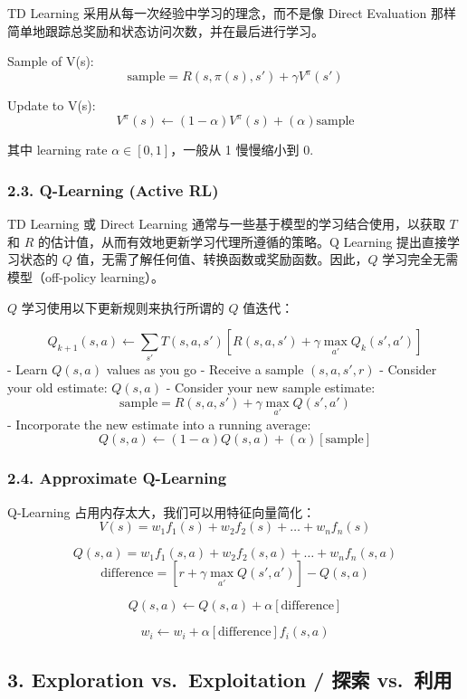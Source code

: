 \documentclass[11pt,a4paper]{article}
\begin{document}
TD Learning 采用从每一次经验中学习的理念，而不是像 Direct Evaluation 那样简单地跟踪总奖励和状态访问次数，并在最后进行学习。

Sample of V(s): \[
\text{sample} = R(s, \pi(s), s') + \gamma V^\pi(s')
\]

Update to V(s): \[
V^\pi(s) \leftarrow (1 - \alpha)V^\pi(s) + (\alpha)\text{sample}
\]

其中 learning rate \(\alpha \in [0,1]\)，一般从 1 慢慢缩小到 0.

\subsubsection{2.3. Q-Learning (Active RL)}\label{q-learning-active-rl}

TD Learning 或 Direct Learning 通常与一些基于模型的学习结合使用，以获取 \(T\) 和 \(R\) 的估计值，从而有效地更新学习代理所遵循的策略。Q Learning 提出直接学习状态的 \(Q\) 值，无需了解任何值、转换函数或奖励函数。因此，\(Q\) 学习完全无需模型（off-policy learning）。

\(Q\) 学习使用以下更新规则来执行所谓的 \(Q\) 值迭代：

\[
Q_{k+1}(s, a) \leftarrow \sum_{s'} T(s, a, s')[R(s, a, s') + \gamma \max_{a'} Q_k(s', a')]
\] - Learn \(Q(s, a)\) values as you go - Receive a sample \((s, a, s', r)\) - Consider your old estimate: \(Q(s, a)\) - Consider your new sample estimate: \[
    \text{sample} = R(s, a, s') + \gamma \max_{a'} Q(s', a')
    \] - Incorporate the new estimate into a running average: \[
    Q(s, a) \leftarrow (1 - \alpha)Q(s, a) + (\alpha) [\text{sample}]
    \]

\subsubsection{2.4. Approximate Q-Learning}\label{approximate-q-learning}

Q-Learning 占用内存太大，我们可以用特征向量简化： \[
V(s) = w_1f_1(s) + w_2f_2(s) + \dots + w_nf_n(s)
\]

\[
Q(s, a) = w_1f_1(s, a) + w_2f_2(s, a) + \dots + w_nf_n(s, a)
\] \[
\text{difference} = \left[r + \gamma \max_{a'} Q(s', a')\right] - Q(s, a)
\]

\[
Q(s, a) \leftarrow Q(s, a) + \alpha [\text{difference}]
\]

\[
w_i \leftarrow w_i + \alpha [\text{difference}] f_i(s, a)
\]

\subsection{3. Exploration vs.~Exploitation / 探索 vs.~利用}\label{exploration-vs.-exploitation-ux63a2ux7d22-vs.-ux5229ux7528}
\end{document}

